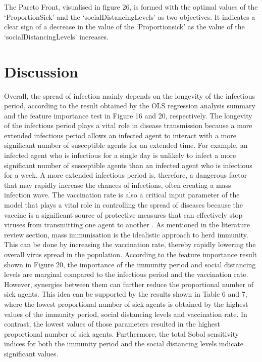 \documentclass[smallextended]{svjour3}       %
\begin{document}
The Pareto Front, visualised in figure 26, is formed with the optimal values of the ‘ProportionSick’ and the ‘socialDistancingLevels’ as two objectives. It indicates a clear sign of a decrease in the value of the ‘Proportionsick’ as the value of the ‘socialDistancingLevels’ increases.


\section{Discussion}

Overall, the spread of infection mainly depends on the longevity of the infectious period, according to the result obtained by the OLS regression analysis summary and the feature importance test in Figure 16 and 20, respectively. The longevity of the infectious period plays a vital role in disease transmission because a more extended infectious period allows an infected agent to interact with a more significant number of susceptible agents for an extended time. For example, an infected agent who is infectious for a single day is unlikely to infect a more significant number of susceptible agents than an infected agent who is infectious for a week. A more extended infectious period is, therefore, a dangerous factor that may rapidly increase the chances of infections, often creating a mass infection wave.
The vaccination rate is also a critical input parameter of the model that plays a vital role in controlling the spread of diseases because the vaccine is a significant source of protective measures that can effectively stop viruses from transmitting one agent to another \cite{storlie2021quantifying}. As mentioned in the literature review section, mass immunisation is the idealistic approach to herd immunity. This can be done by increasing the vaccination rate, thereby rapidly lowering the overall virus spread in the population.
According to the feature importance result shown in Figure 20, the importance of the immunity period and social distancing levels are marginal compared to the infectious period and the vaccination rate. However, synergies between them can further reduce the proportional number of sick agents. This idea can be supported by the results shown in Table 6 and 7, where the lowest proportional number of sick agents is obtained by the highest values of the immunity period, social distancing levels and vaccination rate. In contrast, the lowest values of those parameters resulted in the highest proportional number of sick agents. Furthermore, the total Sobol sensitivity indices for both the immunity period and the social distancing levels indicate significant values.
\end{document}
